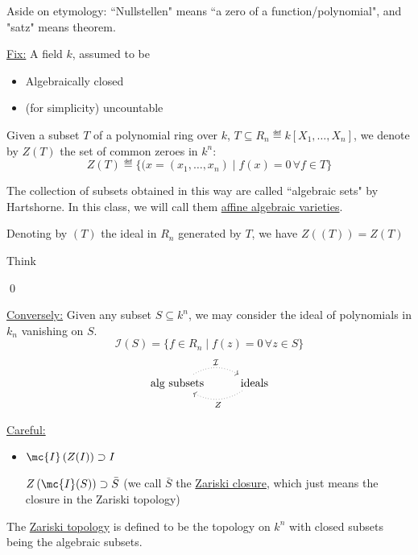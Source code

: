 \documentclass[x11names,reqno,14pt]{extarticle}
\begin{document}
Aside on etymology: ``Nullstellen" means ``a zero of a function/polynomial", and "satz" means theorem. 

\underline{Fix:} A field $k$, assumed to be 
\begin{itemize}

\item Algebraically closed

\item (for simplicity) uncountable

\end{itemize}

Given a subset $T$ of a polynomial ring over $k$, $T \subseteq R_n \eqdef k[X_1,\dots,X_n]$, we denote by $Z(T)$ the set of common zeroes in $k^n$:
\[
Z(T)\eqdef \{(x = (x_1,\dots,x_n) \mid f(x) = 0\, \forall f \in T\}
\]

The collection of subsets obtained in this way are called ``algebraic sets" by Hartshorne. In this class, we will call them \underline{affine algebraic varieties}. 

\claim

Denoting by $(T)$ the ideal in $R_n$ generated by $T$, we have $Z\left((T)\right) = Z(T)$

\proof

Think

\qed

\underline{Conversely:} Given any subset $S\subseteq k^n$, we may consider the ideal of polynomials in $k_n$ vanishing on $S$. 
\[
\mathcal{I}(S) = \{f\in R_n \mid f(z) = 0\, \forall z \in S\}  
\]
\[
\begin{tikzcd}
\text{alg subsets} \ar[r, dotted, bend left = 30, "\mathcal{I}"] & \text{ideals} \ar[l, dotted, bend left = 30, "Z"]
\end{tikzcd}
\]

\underline{Careful:} 
\begin{itemize}

\item $\mc{I}\left(Z(I)\right) \supset I$

$Z\left(\mc{I}(S)\right) \supset \bar{S}$ (we call $\bar{S}$ the \underline{Zariski closure}, which just means the closure in the Zariski topology)

\end{itemize}


The \underline{Zariski topology} is defined to be the topology on $k^n$ with closed subsets being the algebraic subsets. 
\end{document}
